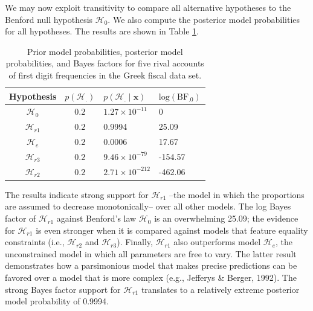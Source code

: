 \documentclass[
  english,
  man,floatsintext]{apa6}
\begin{document}
We may now exploit transitivity to compare all alternative hypotheses to the Benford null hypothesis \(\mathcal{H}_{0}\). We also compute the posterior model probabilities for all hypotheses. The results are shown in Table \ref{Tab:benfordResults}.

\begin{table}[H]
    \centering
    \caption{Prior model probabilities, posterior model probabilities, and Bayes factors for five rival accounts of first digit frequencies in the Greek fiscal data set.}
    \begin{tabular}{ccll}
        \hline Hypothesis &  $p(\mathcal{H}_{.})$ & $p(\mathcal{H}_{.} \mid \mathbf{x})$ & $\text{log}(\text{BF}_{.0})$ \\
        \hline
        $\mathcal{H}_{0}$  & $0.2$  &
        $1.27 \times 10^{-11}$ & $0$ \\
        $\mathcal{H}_{r1}$ & $0.2$ &
        0.9994 & 
        25.09\\
        $\mathcal{H}_{e}$  & $0.2$ &
        0.0006 & 
        17.67\\
        $\mathcal{H}_{r3}$ & $0.2$ &
        $9.46 \times 10^{-79}$ &
        -154.57\\
        $\mathcal{H}_{r2}$ & $0.2$ &
        $2.71 \times 10^{-212}$ & 
        -462.06\\
        \hline
    \end{tabular}
    \label{Tab:benfordResults}
\end{table}

The results indicate strong support for \(\mathcal{H}_{r1}\) --the model in which the proportions are assumed to decrease monotonically-- over all other models. The log Bayes factor of \(\mathcal{H}_{r1}\) against Benford's law \(\mathcal{H}_0\) is an overwhelming 25.09; the evidence for \(\mathcal{H}_{r1}\) is even stronger when it is compared against models that feature equality constraints (i.e., \(\mathcal{H}_{r2}\) and \(\mathcal{H}_{r3}\)). Finally, \(\mathcal{H}_{r1}\) also outperforms model \(\mathcal{H}_{e}\), the unconstrained model in which all parameters are free to vary. The latter result demonstrates how a parsimonious model that makes precise predictions can be favored over a model that is more complex (e.g., Jefferys \& Berger, 1992). The strong Bayes factor support for \(\mathcal{H}_{r1}\) translates to a relatively extreme posterior model probability of 0.9994.
\end{document}
